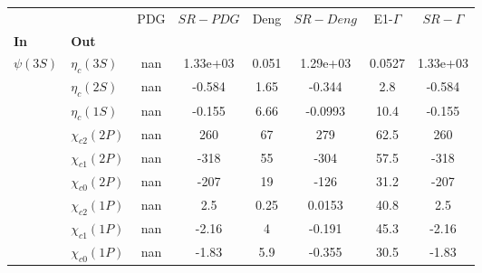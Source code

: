 \begin{tabular}{l|l|c|c|c|c|c|c}
\toprule
           &                 &  PDG &  $SR-PDG$ &  Deng &  $SR-Deng$ &  E1-$\Gamma$ &  $SR-\Gamma$ \\
\textbf{In} & \textbf{Out} &      &           &       &            &              &              \\
\midrule
\textbf{$\psi(3S)$} & \textbf{$\eta_{c}(3S)$} &  nan &  1.33e+03 & 0.051 &   1.29e+03 &       0.0527 &     1.33e+03 \\
           & \textbf{$\eta_{c}(2S)$} &  nan &    -0.584 &  1.65 &     -0.344 &          2.8 &       -0.584 \\
           & \textbf{$\eta_{c}(1S)$} &  nan &    -0.155 &  6.66 &    -0.0993 &         10.4 &       -0.155 \\
           & \textbf{$\chi_{c2}(2P)$} &  nan &       260 &    67 &        279 &         62.5 &          260 \\
           & \textbf{$\chi_{c1}(2P)$} &  nan &      -318 &    55 &       -304 &         57.5 &         -318 \\
           & \textbf{$\chi_{c0}(2P)$} &  nan &      -207 &    19 &       -126 &         31.2 &         -207 \\
           & \textbf{$\chi_{c2}(1P)$} &  nan &       2.5 &  0.25 &     0.0153 &         40.8 &          2.5 \\
           & \textbf{$\chi_{c1}(1P)$} &  nan &     -2.16 &     4 &     -0.191 &         45.3 &        -2.16 \\
           & \textbf{$\chi_{c0}(1P)$} &  nan &     -1.83 &   5.9 &     -0.355 &         30.5 &        -1.83 \\
\bottomrule
\end{tabular}
